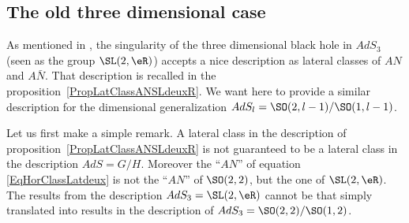 	\subsection{The old three dimensional case}

	As mentioned in \cite{Keio}, the singularity of the three dimensional black hole in $AdS_3$ (seen as the group $\SL(2,\eR)$) accepts a nice description as lateral classes of $AN$ and $A\bar N$. That description is recalled in the proposition~\ref{PropLatClassANSLdeuxR}. We want here to provide a similar description for the dimensional generalization $AdS_l=\SO(2,l-1)/\SO(1,l-1)$.

	Let us first make a simple remark. A lateral class in the description of proposition~\ref{PropLatClassANSLdeuxR} is not guaranteed to be a lateral class in the description $AdS=G/H$. Moreover the ``$AN$'' of equation  \eqref{EqHorClassLatdeux} is not the ``$AN$'' of $\SO(2,2)$, but the one of $\SL(2,\eR)$. The results from the description $AdS_3=\SL(2,\eR)$ cannot be that simply translated into results in the description of $AdS_3=\SO(2,2)/\SO(1,2)$.

